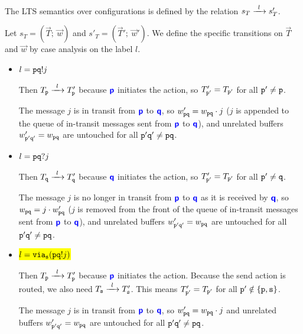 \begin{definition}
The LTS semantics over configurations is defined by
the relation $\treduce{s_T}{s'_T}{l}$.

Let $s_T = (\vec T; ~ \vec w)$ and $s'_T = (\vec T'; ~ \vec w')$.
We define the specific transitions on $\vec T$ and $\vec w$
by case analysis on the label $l$.

\begin{itemize}

\item $l = {\mathtt{p}}{\mathtt{q}}!{j}$

Then $\treduce{T_\mrole{p}}{T'_\mrole{p}}{l}$ 
because ${\color{blue}\bm{\mathsf{p}}}$
initiates the action, so
$T'_{\mathtt{p'}} = T_{{\mathtt{p'}}}$ 
for all ${\mathtt{p'}} \neq {\mathtt{p}}$.

The message $j$ is in transit from ${\color{blue}\bm{\mathsf{p}}}$ to ${\color{blue}\bm{\mathsf{q}}}$, 
so $w'_{{{\mathtt{p}}{\mathtt{q}}}} = w_{{{\mathtt{p}}{\mathtt{q}}}} \cdot j$
($j$ is appended to the queue of in-transit messages
sent from ${\color{blue}\bm{\mathsf{p}}}$ to ${\color{blue}\bm{\mathsf{q}}}$),
and unrelated buffers $w'_{{{\mathtt{p'}}{\mathtt{q'}}}} = w_{{{\mathtt{p}}{\mathtt{q}}}}$ 
are untouched for all ${{\mathtt{p'}}{\mathtt{q'}}} \neq { {\mathtt{p}}  {\mathtt{q}} }$.

\item $l = {\mathtt{p}}{\mathtt{q}}?{j}$

Then $\treduce{T_\mrole{q}}{T'_\mrole{q}}{l}$ 
because ${\color{blue}\bm{\mathsf{q}}}$
initiates the action, so
$T'_{\mathtt{p'}} = T_{{\mathtt{p'}}}$ 
for all ${\mathtt{p'}} \neq {\mathtt{q}}$.

The message $j$ is no longer in transit
from ${\color{blue}\bm{\mathsf{p}}}$ to ${\color{blue}\bm{\mathsf{q}}}$ as it is received by ${\color{blue}\bm{\mathsf{q}}}$,
so $w_{{{\mathtt{p}}{\mathtt{q}}}} = j \cdot w'_{{{\mathtt{p}}{\mathtt{q}}}}$ 
($j$ is removed from the front of the queue of in-transit
messages sent from ${\color{blue}\bm{\mathsf{p}}}$ to ${\color{blue}\bm{\mathsf{q}}}$),
and unrelated buffers $w'_{{{\mathtt{p'}}{\mathtt{q'}}}} = w_{{{\mathtt{p}}{\mathtt{q}}}}$ 
are untouched for all ${{\mathtt{p'}}{\mathtt{q'}}} \neq { {\mathtt{p}}  {\mathtt{q}} }$.

\item \hl{$l = {\texttt{via}_{{\mathtt{s}}}({{\mathtt{p}}{\mathtt{q}}!{j}})}$}

Then $\treduce{T_\mrole{p}}{T'_\mrole{p}}{l}$ 
because ${\color{blue}\bm{\mathsf{p}}}$
initiates the action.
Because the send action is routed, we also need 
$\treduce{T_\mrole{s}}{T'_\mrole{s}}{l}$.
This means
$T'_{\mathtt{p'}} = T_{{\mathtt{p'}}}$ 
for all ${\mathtt{p'}} \notin \{{\mathtt{p}} , {\mathtt{s}} \}$.

The message $j$ is in transit from ${\color{blue}\bm{\mathsf{p}}}$ to ${\color{blue}\bm{\mathsf{q}}}$, 
so $w'_{{{\mathtt{p}}{\mathtt{q}}}} = w_{{{\mathtt{p}}{\mathtt{q}}}} \cdot j$
and unrelated buffers $w'_{{{\mathtt{p'}}{\mathtt{q'}}}} = w_{{{\mathtt{p}}{\mathtt{q}}}}$ 
are untouched for all ${{\mathtt{p'}}{\mathtt{q'}}} \neq { {\mathtt{p}}  {\mathtt{q}} }$.


\end{itemize}
\end{definition}
